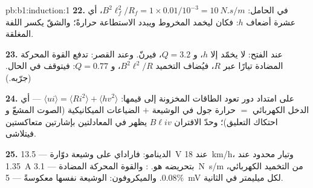 \begin{solution}{pb:b1:induction:1}
\textbf{22.} في الحامل: $B^2\ell_f^2/R_f = 1 \times 0.01/10^{-3} = \qty{10}{N.s/m}$، أي عشرة
أضعاف $h$: فكان ليخمد المخروط ويبدد الاستطاعة حرارةً؛ والشقّ
يكسر اللفة المغلقة.

\textbf{23.} عند الفتح: لا يخمّد إلا $h$، و $Q = 3.2$، فيرنّ. وعند القصر: تدفع
القوة المحركة المضادة تيارًا عبر $R$، فيُضاف التخميد $B^2\ell^2/R$، و
$Q = 0.77$: فيتوقف في الحال. (جرّبه.)

\textbf{24.} على امتداد دور تعود الطاقات المخزونة إلى قيمها:
$\langle ui\rangle = \langle Ri^2\rangle + \langle hv^2\rangle$ --- أي الدخل الكهربائي $=$
حرارة جول في الوشيعة $+$ الضياعات الميكانيكية (الصوت المشعّ و
احتكاك التعليق)؛ وحدّ الاقتران $B\ell iv$ يظهر في المعادلتين
بإشارتين متعاكستين فيتلاشى.

\textbf{25.} الدينامو: فاراداي على وشيعة دوّارة --- \qty{13.5}{V} عند
\qty{18}{km/h}، وتيار محدود عند \qty{1.35}{A} بتحريضه هو.
:  والقوة المحركة المضادة --- \qty{3.1}{N.s/m} من التخميد
الكهربائي،  $0.08\%$. والميكروفون: الوشيعة نفسها معكوسةً ---
\qty{5}{mV} لكل ميليمتر في الثانية.
\end{solution}
